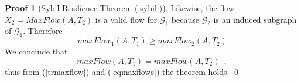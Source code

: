 \documentclass[11pt]{llncs}
\theoremstyle{definition}
\newtheorem{sepproof}{Proof}
\begin{document}
\begin{sepproof}[Sybil Resilience Theorem (\ref{sybil})]
       Likewise, the flow $X_2 = MaxFlow(A, T_2)$ is a valid flow for $\mathcal{G}_1$ because $\mathcal{G}_2$ is an induced
       subgraph of $\mathcal{G}_1$. Therefore
       \begin{equation}
          maxFlow_1\left(A, T_1\right) \geq maxFlow_2\left(A, T_2\right)
       \end{equation}
       We conclude that
       \begin{equation}
       \label{eqmaxflows}
          maxFlow\left(A, T_1\right) = maxFlow\left(A, T_2\right) \enspace,
       \end{equation}
       thus from (\ref{trmaxflow}) and (\ref{eqmaxflows}) the theorem holds.
       \qed
    \end{sepproof}
\end{document}
